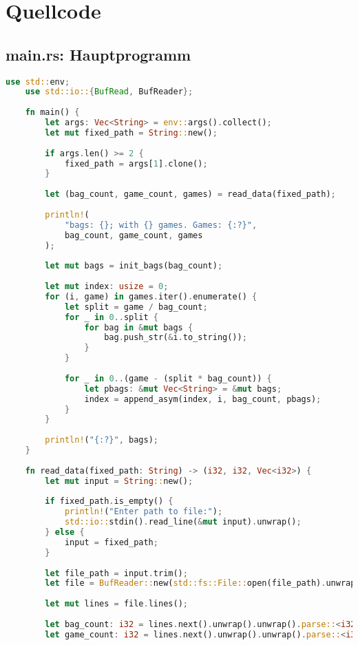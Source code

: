\section{Quellcode}
\subsection{main.rs: Hauptprogramm}

\begin{lstlisting}[language=Rust, style=colouredRust]
    use std::env;
    use std::io::{BufRead, BufReader};
    
    fn main() {
        let args: Vec<String> = env::args().collect();
        let mut fixed_path = String::new();
    
        if args.len() >= 2 {
            fixed_path = args[1].clone();
        }
    
        let (bag_count, game_count, games) = read_data(fixed_path);
    
        println!(
            "bags: {}; with {} games. Games: {:?}",
            bag_count, game_count, games
        );
    
        let mut bags = init_bags(bag_count);
    
        let mut index: usize = 0;
        for (i, game) in games.iter().enumerate() {
            let split = game / bag_count;
            for _ in 0..split {
                for bag in &mut bags {
                    bag.push_str(&i.to_string());
                }
            }
    
            for _ in 0..(game - (split * bag_count)) {
                let pbags: &mut Vec<String> = &mut bags;
                index = append_asym(index, i, bag_count, pbags);
            }
        }
    
        println!("{:?}", bags);
    }
    
    fn read_data(fixed_path: String) -> (i32, i32, Vec<i32>) {
        let mut input = String::new();
    
        if fixed_path.is_empty() {
            println!("Enter path to file:");
            std::io::stdin().read_line(&mut input).unwrap();
        } else {
            input = fixed_path;
        }
    
        let file_path = input.trim();
        let file = BufReader::new(std::fs::File::open(file_path).unwrap());
    
        let mut lines = file.lines();
    
        let bag_count: i32 = lines.next().unwrap().unwrap().parse::<i32>().unwrap();
        let game_count: i32 = lines.next().unwrap().unwrap().parse::<i32>().unwrap();
    

\end{lstlisting}
